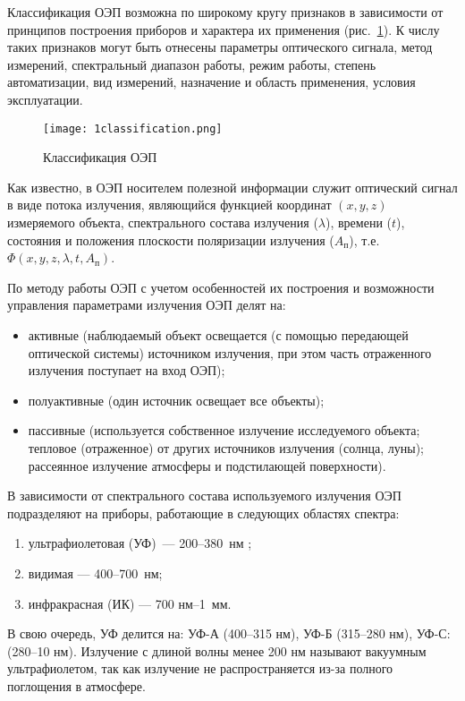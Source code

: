 Классификация ОЭП возможна по широкому кругу признаков в зависимости от принципов построения приборов и характера их применения (рис.~\ref{pic:1Classification}). К числу таких признаков могут быть отнесены параметры оптического сигнала, метод измерений, спектральный диапазон работы, режим работы, степень автоматизации, вид измерений, назначение и область применения, условия эксплуатации.
\begin{figure}[H]
	\caption{Классификация ОЭП}
	\texttt{[image: 1classification.png]}
	\label{pic:1Classification}
\end{figure}

Как известно, в ОЭП носителем полезной информации служит оптический сигнал в виде потока излучения, являющийся функцией координат $(x, y, z)$ измеряемого объекта, спектрального состава излучения ($\lambda$), времени ($t$), состояния и положения плоскости поляризации излучения ($A_\text{п}$), т.е. $\Phi(x, y, z, \lambda, t, A_\text{п})$. 

По методу работы ОЭП с учетом особенностей их построения и возможности управления параметрами излучения ОЭП делят на:
\begin{itemize}
	\item активные (наблюдаемый объект освещается (с помощью передающей оптической системы) источником излучения, при этом часть отраженного излучения поступает на вход ОЭП);
	\item полуактивные (один источник освещает все объекты);
	\item пассивные (используется собственное излучение исследуемого объекта; тепловое  (отраженное) от других источников излучения (солнца, луны); рассеянное излучение атмосферы и подстилающей поверхности).
\end{itemize}

В зависимости от спектрального состава используемого излучения ОЭП подразделяют на приборы, работающие в следующих областях спектра:
\begin{enumerate}
	\item ультрафиолетовая (УФ)~--- 200--380~нм ;
	\item видимая --- 400--700~нм;
	\item инфракрасная (ИК) --- 700 нм--1~мм.
\end{enumerate}

В свою очередь, УФ делится на: УФ-А (400--315 нм), УФ-Б (315--280 нм), УФ-С: (280--10 нм). Излучение с длиной волны менее 200 нм называют вакуумным ультрафиолетом, так как излучение не распространяется из-за полного поглощения в атмосфере.

